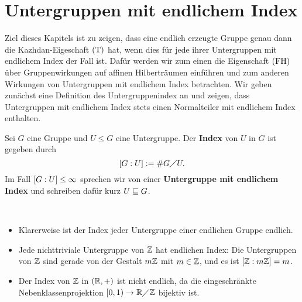 \chapter{Untergruppen mit endlichem Index}
\label{cha:subgroups_finite_index}
	Ziel dieses Kapitels ist zu zeigen, dass eine endlich erzeugte Gruppe genau dann die Kazhdan-Eigeschaft $\operatorname{(T)}$ hat, wenn dies für jede ihrer Untergruppen mit endlichem Index der Fall ist. Dafür werden wir zum einen die Eigenschaft $\operatorname{(FH)}$ über Gruppenwirkungen auf affinen Hilberträumen einführen und zum anderen Wirkungen von Untergruppen mit endlichem Index betrachten. Wir geben zunächst eine Definition des Untergruppenindex an und zeigen, dass Untergruppen mit endlichem Index stets einen Normalteiler mit endlichem Index enthalten.

\begin{definition}[Index]
	Sei $G$ eine Gruppe und $U \leq G$ eine Untergruppe. Der \textbf{Index} von $U$ in $G$ ist gegeben durch
	\[
	\left\lbrack G : U\right\rbrack := \#G \diagup U.
	\]
	Im Fall $\left\lbrack G:U\right\rbrack \le \infty$ sprechen wir von einer \textbf{Untergruppe mit endlichem Index} und schreiben dafür kurz $U \sqsubseteq G$.
\end{definition}
	
\begin{beispiel}
	\mbox{} \\[-1cm]
	\begin{itemize}
		\item Klarerweise ist der Index jeder Untergruppe einer endlichen Gruppe endlich.
		\item Jede nichttriviale Untergruppe von $\mathbb{Z}$ hat endlichen Index: Die Untergruppen von $\mathbb{Z}$ sind gerade von der Gestalt $m\mathbb{Z}$ mit $m \in \mathbb{Z}$, und es ist $\left\lbrack\mathbb{Z} : m\mathbb{Z}\right\rbrack = m$.
		\item Der Index von $\mathbb{Z}$ in $(\mathbb{R},+)$ ist nicht endlich, da die eingeschränkte Nebenklassenprojektion $[0,1) \rightarrow \mathbb{R} \diagup \mathbb{Z}$ bijektiv ist.
	\end{itemize}
\end{beispiel}

